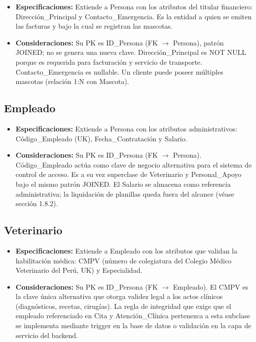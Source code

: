 \begin{itemize}
	\item \textbf{Especificaciones:} Extiende a Persona con los atributos del titular financiero: Dirección\_Principal y Contacto\_Emergencia. Es la entidad a quien se emiten las facturas y bajo la cual se registran las mascotas.
	\item \textbf{Consideraciones:} Su PK es ID\_Persona (FK $\rightarrow$ Persona), patrón JOINED; no se genera una nueva clave. Dirección\_Principal es NOT NULL porque es requerida para facturación y servicio de transporte. Contacto\_Emergencia es nullable. Un cliente puede poseer múltiples mascotas (relación 1:N con Mascota).
\end{itemize}

\subsection{Empleado}

\begin{itemize}
	\item \textbf{Especificaciones:} Extiende a Persona con los atributos administrativos: Código\_Empleado (UK), Fecha\_Contratación y Salario.
	\item \textbf{Consideraciones:} Su PK es ID\_Persona (FK $\rightarrow$ Persona). Código\_Empleado actúa como clave de negocio alternativa para el sistema de control de acceso. Es a su vez superclase de Veterinario y Personal\_Apoyo bajo el mismo patrón JOINED. El Salario se almacena como referencia administrativa; la liquidación de planillas queda fuera del alcance (véase sección 1.8.2).
\end{itemize}

\subsection{Veterinario}

\begin{itemize}
	\item \textbf{Especificaciones:} Extiende a Empleado con los atributos que validan la habilitación médica: CMPV (número de colegiatura del Colegio Médico Veterinario del Perú, UK) y Especialidad.
	\item \textbf{Consideraciones:} Su PK es ID\_Persona (FK $\rightarrow$ Empleado). El CMPV es la clave única alternativa que otorga validez legal a los actos clínicos (diagnósticos, recetas, cirugías). La regla de integridad que exige que el empleado referenciado en Cita y Atención\_Clínica pertenezca a esta subclase se implementa mediante trigger en la base de datos o validación en la capa de servicio del backend.
\end{itemize}

